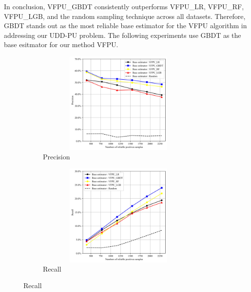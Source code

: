 \documentclass[10pt,journal,compsoc]{IEEEtran}
\begin{document}
In conclusion, VFPU\_GBDT consistently outperforms VFPU\_LR, VFPU\_RF, VFPU\_LGB, and the random sampling technique across all datasets. Therefore, GBDT stands out as the most reliable base estimator for the VFPU algorithm in addressing our UDD-PU problem. The following experiments use GBDT as the base esitmator for our method VFPU.

\begin{figure}[!htbp]
	\centering
	
	\captionsetup{size=footnotesize}
	\begin{subfigure}{0.45\textwidth}
		\centering
		\captionsetup{skip=1pt}
		\captionsetup{size=scriptsize}
		\includegraphics[width=0.9\textwidth,height=5.1cm]{./Figure 2 (1) in JEPG format}
		\caption{Precision}
		\label{RQ2.1.sub1}
	\end{subfigure}
	\begin{subfigure}{0.45\textwidth}
		\centering
		\captionsetup{skip=4pt}
		\captionsetup{size=scriptsize}
		\includegraphics[width=0.9\textwidth,height=5.1cm]{./Figure 2 (2) in JEPG format}
		\caption{Recall}
		\label{RQ2.1.sub2}
	\end{subfigure}
	
	

\end{figure}
\end{document}
